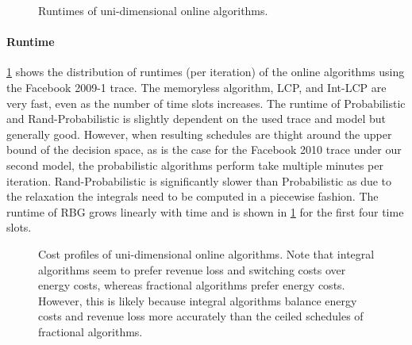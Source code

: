 \begin{figure}
    \begin{subfigure}[b]{.5175\linewidth}
    \resizebox{\textwidth}{!}{}
    \end{subfigure}
    \begin{subfigure}[b]{.4825\linewidth}
    \resizebox{\textwidth}{!}{}
    \end{subfigure}
    \caption{Runtimes of uni-dimensional online algorithms.}\label{fig:case_studies:ud:runtimes}
\end{figure}

\paragraph{Runtime} \cref{fig:case_studies:ud:runtimes} shows the distribution of runtimes (per iteration) of the online algorithms using the Facebook 2009-1 trace. The memoryless algorithm, LCP, and Int-LCP are very fast, even as the number of time slots increases. The runtime of Probabilistic and Rand-Probabilistic is slightly dependent on the used trace and model but generally good. However, when resulting schedules are thight around the upper bound of the decision space, as is the case for the Facebook 2010 trace under our second model, the probabilistic algorithms perform take multiple minutes per iteration. Rand-Probabilistic is significantly slower than Probabilistic as due to the relaxation the integrals need to be computed in a piecewise fashion. The runtime of RBG grows linearly with time and is shown in \cref{fig:case_studies:ud:runtimes} for the first four time slots.

\begin{figure}
    \centering
    
    \caption{Cost profiles of uni-dimensional online algorithms. Note that integral algorithms seem to prefer revenue loss and switching costs over energy costs, whereas fractional algorithms prefer energy costs. However, this is likely because integral algorithms balance energy costs and revenue loss more accurately than the ceiled schedules of fractional algorithms.}\label{fig:case_studies:ud:costs}
\end{figure}

